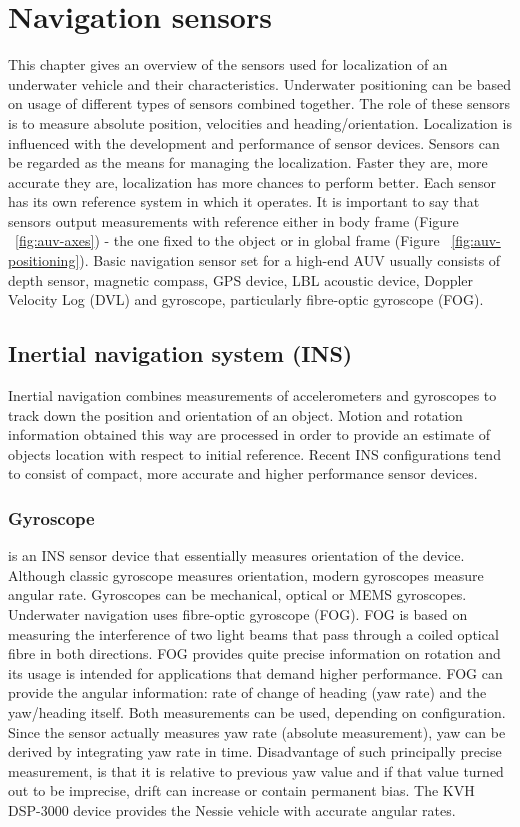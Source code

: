 \chapter{Navigation sensors} \label{chap:sensors}
This chapter gives an overview of the sensors used for localization of an underwater vehicle and their characteristics.  Underwater positioning can be based on usage of different types of sensors combined together. The role of these sensors is to measure absolute position, velocities and heading/orientation. Localization is influenced with the development and performance of sensor devices. Sensors can be regarded as the means for managing the localization. Faster they are, more accurate they are, localization has more chances to perform better. Each sensor has its own reference system in which it operates. It is important to say that sensors output measurements with reference either in body frame (Figure ~\ref{fig:auv-axes}) - the one fixed to the object or in global frame (Figure ~\ref{fig:auv-positioning}). Basic navigation sensor set for a high-end AUV usually consists of depth sensor, magnetic compass, GPS device, LBL acoustic device, Doppler Velocity Log (DVL) and gyroscope, particularly fibre-optic gyroscope (FOG).   
\section{Inertial navigation system (INS)} \label{sec:ins}
Inertial navigation combines measurements of accelerometers and gyroscopes to track down the position and orientation of an object. Motion and rotation information obtained this way are processed in order to provide an estimate of objects location with respect to  initial reference. Recent INS configurations tend to consist of compact, more accurate and higher performance sensor devices.  
\subsection{Gyroscope}
is an INS sensor device that essentially measures orientation of the device. Although classic gyroscope measures orientation, modern gyroscopes measure angular rate. Gyroscopes can be mechanical, optical or MEMS gyroscopes. Underwater navigation uses fibre-optic gyroscope (FOG). FOG is based on measuring the interference of two light beams that pass through a coiled optical fibre in both directions. FOG provides quite precise information on rotation and its usage is intended for applications that demand higher performance. 
FOG can provide the angular information: rate of change of heading (yaw rate) and the yaw/heading itself. Both measurements can be used, depending on configuration. Since the sensor actually measures yaw rate (absolute measurement), yaw can be derived by integrating yaw rate in time. Disadvantage of such principally precise measurement, is that it is relative to previous yaw value and if that value turned out to be imprecise, drift can increase or contain permanent bias. The KVH DSP-3000 device provides the Nessie vehicle with accurate angular rates.
